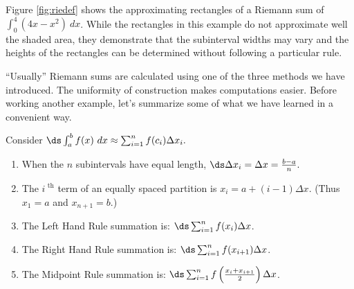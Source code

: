 Figure \ref{fig:riedef} shows the approximating rectangles of a Riemann sum of $\int_0^4(4x-x^2)\ dx$. While the rectangles in this example do not approximate well the shaded area, they demonstrate that the subinterval widths may vary and the heights of the rectangles can be determined without following a particular rule.

``Usually'' Riemann sums are calculated using one of the three methods we have introduced. The uniformity of construction  makes computations easier. Before working another example, let's summarize some of what we have learned in a convenient way.

{Consider $\ds \int_a^b f(x) \ dx \approx \sum_{i=1}^n f(c_i)\Delta x_i.$ 

\begin{enumerate}
\item	When the $n$ subintervals have equal length, $\ds \Delta x_i = \Delta x = \frac{b-a}n.$
\item		The $i^\text{ th}$ term of an equally spaced partition is $x_i = a + (i-1)\Delta x$. (Thus $x_1=a$ and  $x_{n+1} = b$.)
\item		The Left Hand Rule summation is: $\ds \sum_{i=1}^n f(x_i)\Delta x$.
\item		The Right Hand Rule summation is: $\ds \sum_{i=1}^n f(x_{i+1})\Delta x$.
\item		The Midpoint Rule summation is: $\ds \sum_{i=1}^n f\left(\frac{x_i+x_{i+1}}{2}\right)\Delta x$.
\end{enumerate}
}
\restoreboxwidth
%
%
%


